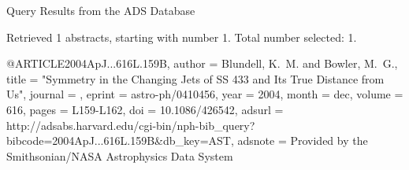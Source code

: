 Query Results from the ADS Database


Retrieved 1 abstracts, starting with number 1.  Total number selected: 1.

@ARTICLE{2004ApJ...616L.159B,
   author = {{Blundell}, K.~M. and {Bowler}, M.~G.},
    title = "{Symmetry in the Changing Jets of SS 433 and Its True Distance from Us}",
  journal = {\apjl},
   eprint = {astro-ph/0410456},
     year = 2004,
    month = dec,
   volume = 616,
    pages = {L159-L162},
      doi = {10.1086/426542},
   adsurl = {http://adsabs.harvard.edu/cgi-bin/nph-bib_query?bibcode=2004ApJ...616L.159B&db_key=AST},
  adsnote = {Provided by the Smithsonian/NASA Astrophysics Data System}
}


